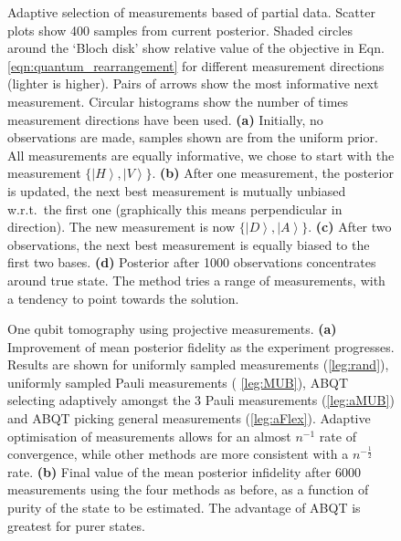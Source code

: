 \begin{figure}
	\caption[Illustration of adaptive tomography on a single-photon system]{Adaptive selection of measurements based of partial data. Scatter plots show 400 samples from current posterior. Shaded circles around the `Bloch disk' show relative value of the objective in Eqn.\,\eqref{eqn:quantum_rearrangement} for different measurement directions (lighter is higher). Pairs of arrows show the most informative next measurement. Circular histograms show the number of times measurement directions have been used. \textbf{(a)}  Initially, no observations are made, samples shown are from the uniform prior. All measurements are equally informative, we chose to start with the measurement $\{\left\vert H\right\rangle,\left\vert V\right\rangle\}$. \textbf{(b)}  After one measurement, the posterior is updated, the next best measurement is mutually unbiased w.r.t.\ the first one (graphically this means perpendicular in direction). The new measurement is now $\{\left\vert D\right\rangle,\left\vert A\right\rangle\}$. \textbf{(c)} After two observations, the next best measurement is equally biased to the first two bases. \textbf{(d)} Posterior after 1000 observations concentrates around true state. The method tries a range of measurements, with a tendency to point towards the solution.
	\label{fig:Bloch_disk}}
\end{figure}

\begin{figure}
	
	\caption[Single-qubit adaptive tomography using projective measurements.]{One qubit tomography using projective measurements. \textbf{(a)}  Improvement of mean posterior fidelity as the experiment progresses. Results are shown for uniformly sampled measurements (\ref{leg:rand}), uniformly sampled Pauli measurements ( \ref{leg:MUB}), ABQT selecting adaptively amongst the 3 Pauli measurements (\ref{leg:aMUB}) and ABQT picking general measurements (\ref{leg:aFlex}). Adaptive optimisation of measurements allows for an almost $n^{-1}$ rate of convergence, while other methods are more consistent with a $n^{-\frac{1}{2}}$ rate. \textbf{(b)}  Final value of the mean posterior infidelity after 6000 measurements using the four methods as before, as a function of purity of the state to be estimated. The advantage of ABQT is greatest for purer states. \label{fig:qubit_results}}
\end{figure}

